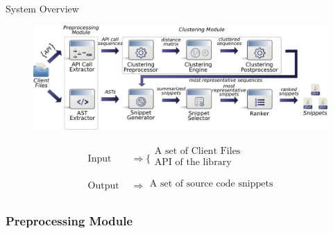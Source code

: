 \documentclass[11pt]{beamer}
\begin{document}
\begin{frame}{System Overview}{}
	\begin{figure}
		\includegraphics[scale=0.4]{CLAMSArchitecture}
	\end{figure}
	\begin{align*}
		\begin{array}{ll} 
		\textrm{Input}
		\end{array}                    & \Rightarrow 
		\bigg\{\begin{array}{ll}  
		\textrm{A set of Client Files} &             \\
		\textrm{API of the library}\\
		\end{array}\\
		\begin{array}{ll}  %
		\textrm{Output}
		\end{array}                    & \Rightarrow 
		\begin{array}{l}
		\textrm{A set of source code snippets} \\
		\end{array}
	\end{align*}
\end{frame}

\subsubsection*{Preprocessing Module}
\end{document}
